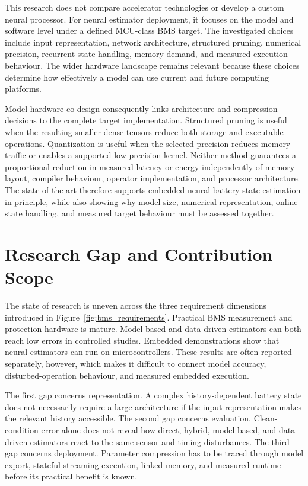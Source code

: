 \documentclass[
    a4paper,
    12pt,
    titlepage,
    bibliography=totoc,
    twoside=on,
    parskip=false,
    numbers=noenddot,
    cleardoublepage=empty,
    DIV=12,
    BCOR=12.0mm,
    headheight=36pt,
    headings=openright
]{scrreprt}
\begin{document}
This research does not compare accelerator technologies or develop a custom neural processor. For neural estimator deployment, it focuses on the model and software level under a defined MCU-class BMS target. The investigated choices include input representation, network architecture, structured pruning, numerical precision, recurrent-state handling, memory demand, and measured execution behaviour. The wider hardware landscape remains relevant because these choices determine how effectively a model can use current and future computing platforms.

Model-hardware co-design consequently links architecture and compression decisions to the complete target implementation. Structured pruning is useful when the resulting smaller dense tensors reduce both storage and executable operations. Quantization is useful when the selected precision reduces memory traffic or enables a supported low-precision kernel. Neither method guarantees a proportional reduction in measured latency or energy independently of memory layout, compiler behaviour, operator implementation, and processor architecture. The state of the art therefore supports embedded neural battery-state estimation in principle, while also showing why model size, numerical representation, online state handling, and measured target behaviour must be assessed together.\autocite{hanLearningBothWeights2015,jacobQuantizationTrainingNeural2017,schulzePQBenchBenchmarking2025,abushahlaNeuralNetworkQuantization2026}

\section{Research Gap and Contribution Scope}
The state of research is uneven across the three requirement dimensions introduced in Figure~\ref{fig:bms_requirements}. Practical BMS measurement and protection hardware is mature. Model-based and data-driven estimators can both reach low errors in controlled studies. Embedded demonstrations show that neural estimators can run on microcontrollers. These results are often reported separately, however, which makes it difficult to connect model accuracy, disturbed-operation behaviour, and measured embedded execution.

The first gap concerns representation. A complex history-dependent battery state does not necessarily require a large architecture if the input representation makes the relevant history accessible. The second gap concerns evaluation. Clean-condition error alone does not reveal how direct, hybrid, model-based, and data-driven estimators react to the same sensor and timing disturbances. The third gap concerns deployment. Parameter compression has to be traced through model export, stateful streaming execution, linked memory, and measured runtime before its practical benefit is known.
\end{document}

